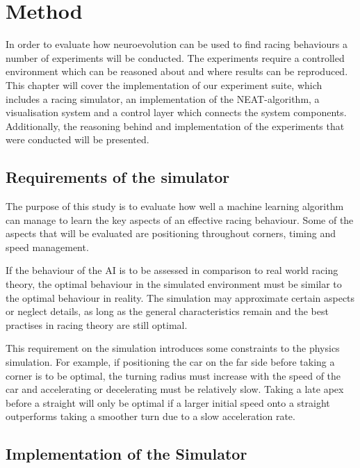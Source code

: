 
\chapter{Method}

In order to evaluate how neuroevolution can be used to find racing behaviours a number of experiments will be conducted. The experiments require a controlled environment which can be reasoned about and where results can be reproduced. This chapter will cover the implementation of our experiment suite, which includes a racing simulator, an implementation of the NEAT-algorithm, a visualisation system and a control layer which connects the system components. Additionally, the reasoning behind and implementation of the experiments that were conducted will be presented. 

\section{Requirements of the simulator}

The purpose of this study is to evaluate how well a machine learning algorithm can manage to learn the key aspects of an effective racing behaviour. Some of the aspects that will be evaluated are positioning throughout corners, timing and speed management. 

If the behaviour of the AI is to be assessed in comparison to real world racing theory, the optimal behaviour in the simulated environment must be similar to the optimal behaviour in reality. The simulation may approximate certain aspects or neglect details, as long as the general characteristics remain and the best practises in racing theory are still optimal. %

This requirement on the simulation introduces some constraints to the physics simulation. For example, if positioning the car on the far side before taking a corner is to be optimal, the turning radius must increase with the speed of the car and accelerating or decelerating must be relatively slow. Taking a late apex before a straight will only be optimal if a larger initial speed onto a straight outperforms taking a smoother turn due to a slow acceleration rate. 


\section{Implementation of the Simulator}

